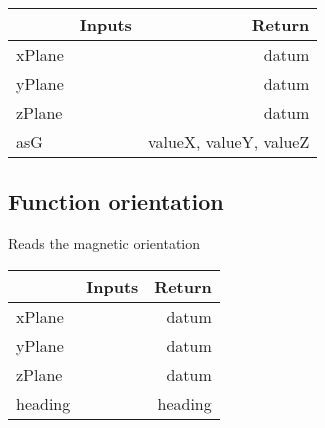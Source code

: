 \documentclass[a4paper,12pt,oneside,pdflatex,italian,final,twocolumn]{article}
\begin{document}
\centering
\begin{tabular}{lcr}
\toprule
  & Inputs & Return \\
\midrule
xPlane &
&
datum
\\
yPlane &
&
datum
\\
zPlane &
&
datum
\\
asG &
&
valueX, 
valueY, 
valueZ
\\
\bottomrule
\end{tabular}



\raggedright
\subsection{Function orientation }
Reads the magnetic orientation \\

\centering
\begin{tabular}{lcr}
\toprule
  & Inputs & Return \\
\midrule
xPlane &
&
datum
\\
yPlane &
&
datum
\\
zPlane &
&
datum
\\
heading &
&
heading
\\
\bottomrule
\end{tabular}



\raggedright
\end{document}
